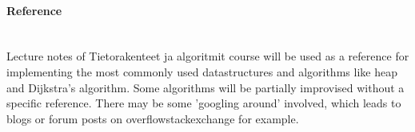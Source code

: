 \documentclass[a4paper,12pt]{article}
\begin{document}
\paragraph{Reference} \hspace{0pt} \\

Lecture notes of Tietorakenteet ja algoritmit course will be used as a reference for implementing the most commonly used datastructures and algorithms like heap and Dijkstra's algorithm. Some algorithms will be partially improvised without a specific reference. There may be some 'googling around' involved, which leads to blogs or forum posts on overflowstackexchange for example.
\end{document}
